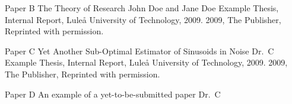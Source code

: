 \documentclass[12pt,a4paper,openright,final,twoside]{cseethesis}
\begin{document}
\makepaper
  {\paperheader}
  {\papertitle}
  {\paperauthorstring}
  {}
  {\copyrightstring}




\def\paperheader{Paper B}
\def\papertitle{The Theory of Research}
\def\paperauthorstring{John Doe and Jane Doe}
\def\referencestring{Example Thesis, Internal Report, Lule{\aa} University of Technology, 2009.}
\def\copyrightstring{2009, The Publisher, Reprinted with permission.}


\makepaperaccepted
  {\paperheader}
  {\papertitle}
  {\paperauthorstring}
  {\referencestring}
  {\copyrightstring}



\def\paperheader{Paper C}
\def\papertitle{Yet Another Sub-Optimal Estimator of Sinusoids in Noise}
\def\paperauthorstring{Dr.\ C}
\def\referencestring{Example Thesis, Internal Report, Lule{\aa} University of Technology, 2009.}
\def\copyrightstring{2009, The Publisher, Reprinted with permission.}


\makepapersubmitted
  {\paperheader}
  {\papertitle}
  {\paperauthorstring}
  {\referencestring}
  {\copyrightstring}



\def\paperheader{Paper D}
\def\papertitle{An example of a yet-to-be-submitted paper}
\def\paperauthorstring{Dr.\ C}


\makepapertobesubmitted
  {\paperheader}
  {\papertitle}
  {\paperauthorstring}


\end{document}
